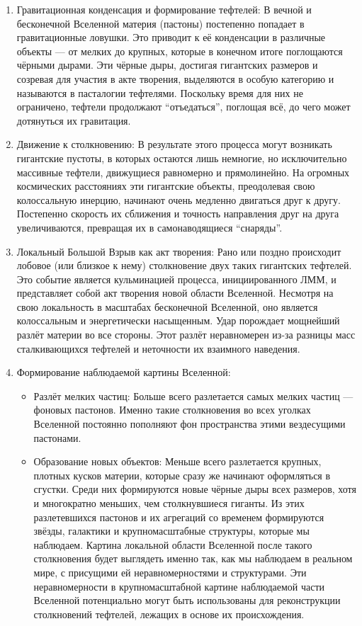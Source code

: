 \documentclass[pdflatex,sn-mathphys-num]{sn-jnl}
\begin{document}
\begin{enumerate}
    \item Гравитационная конденсация и формирование тефтелей: В вечной и бесконечной Вселенной материя (пастоны) постепенно попадает в гравитационные ловушки. Это приводит к её конденсации в различные объекты --- от мелких до крупных, которые в конечном итоге поглощаются чёрными дырами. Эти чёрные дыры, достигая гигантских размеров и созревая для участия в акте творения, выделяются в особую категорию и называются в пасталогии тефтелями. Поскольку время для них не ограничено, тефтели продолжают ``отъедаться'', поглощая всё, до чего может дотянуться их гравитация.
    \item Движение к столкновению: В результате этого процесса могут возникать гигантские пустоты, в которых остаются лишь немногие, но исключительно массивные тефтели, движущиеся равномерно и прямолинейно. На огромных космических расстояниях эти гигантские объекты, преодолевая свою колоссальную инерцию, начинают очень медленно двигаться друг к другу. Постепенно скорость их сближения и точность направления друг на друга увеличиваются, превращая их в самонаводящиеся ``снаряды''.
    \item Локальный Большой Взрыв как акт творения: Рано или поздно происходит лобовое (или близкое к нему) столкновение двух таких гигантских тефтелей. Это событие является кульминацией процесса, инициированного ЛММ, и представляет собой акт творения новой области Вселенной. Несмотря на свою локальность в масштабах бесконечной Вселенной, оно является колоссальным и энергетически насыщенным. Удар порождает мощнейший разлёт материи во все стороны. Этот разлёт неравномерен из-за разницы масс сталкивающихся тефтелей и неточности их взаимного наведения.
    \item Формирование наблюдаемой картины Вселенной:
    \begin{itemize}
        \item Разлёт мелких частиц: Больше всего разлетается самых мелких частиц --- фоновых пастонов. Именно такие столкновения во всех уголках Вселенной постоянно пополняют фон пространства этими вездесущими пастонами.
        \item Образование новых объектов: Меньше всего разлетается крупных, плотных кусков материи, которые сразу же начинают оформляться в сгустки. Среди них формируются новые чёрные дыры всех размеров, хотя и многократно меньших, чем столкнувшиеся гиганты. Из этих разлетевшихся пастонов и их агрегаций со временем формируются звёзды, галактики и крупномасштабные структуры, которые мы наблюдаем. Картина локальной области Вселенной после такого столкновения будет выглядеть именно так, как мы наблюдаем в реальном мире, с присущими ей неравномерностями и структурами. Эти неравномерности в крупномасштабной картине наблюдаемой части Вселенной потенциально могут быть использованы для реконструкции столкновений тефтелей, лежащих в основе их происхождения.
    \end{itemize}
\end{enumerate}
\end{document}
